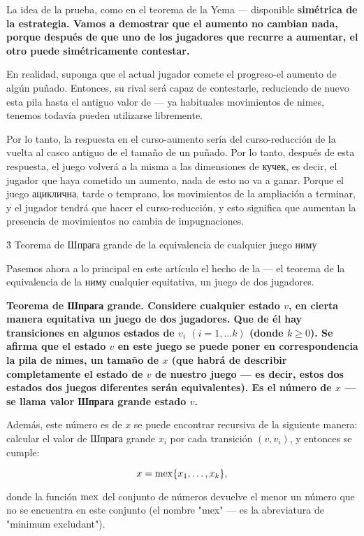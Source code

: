 La idea de la prueba, como en el teorema de la Yema --- disponible \bf{simétrica de la estrategia}. Vamos a demostrar que el aumento no cambian nada, porque después de que uno de los jugadores que recurre a aumentar, el otro puede simétricamente contestar.

En realidad, suponga que el actual jugador comete el progreso-el aumento de algún puñado. Entonces, su rival será capaz de contestarle, reduciendo de nuevo esta pila hasta el antiguo valor de --- ya habituales movimientos de nimes, tenemos todavía pueden utilizarse libremente.

Por lo tanto, la respuesta en el curso-aumento sería del curso-reducción de la vuelta al casco antiguo de el tamaño de un puñado. Por lo tanto, después de esta respuesta, el juego volverá a la misma a las dimensiones de кучек, es decir, el jugador que haya cometido un aumento, nada de esto no va a ganar. Porque el juego ациклична, tarde o temprano, los movimientos de la ampliación a terminar, y el jugador tendrá que hacer el curso-reducción, y esto significa que aumentan la presencia de movimientos no cambia de impugnaciones.


\h3{ Teorema de Шпрага grande de la equivalencia de cualquier juego ниму }

Pasemos ahora a lo principal en este artículo el hecho de la --- el teorema de la equivalencia de la ниму cualquier equitativa, un juego de dos jugadores.

\bf{Teorema de Шпрага grande}. Considere cualquier estado $v$, en cierta manera equitativa un juego de dos jugadores. Que de él hay transiciones en algunos estados de $v_i$ $(i=1, \ldots k)$ (donde $k \ge 0$). Se afirma que el estado $v$ en este juego se puede poner en correspondencia la pila de nimes, un tamaño de $x$ (que habrá de describir completamente el estado de $v$ de nuestro juego --- es decir, estos dos estados dos juegos diferentes serán equivalentes). Es el número de $x$ --- se llama \bf{valor Шпрага grande} estado $v$.

Además, este número es de $x$ se puede encontrar recursiva de la siguiente manera: calcular el valor de Шпрага grande $x_i$ por cada transición $(v,v_i)$, y entonces se cumple:

$$ x = {\rm mex} \{ x_1, \ldots, x_k \}, $$

donde la función $\rm mex$ del conjunto de números devuelve el menor un número que no se encuentra en este conjunto (el nombre "mex" --- es la abreviatura de "minimum excludant").

